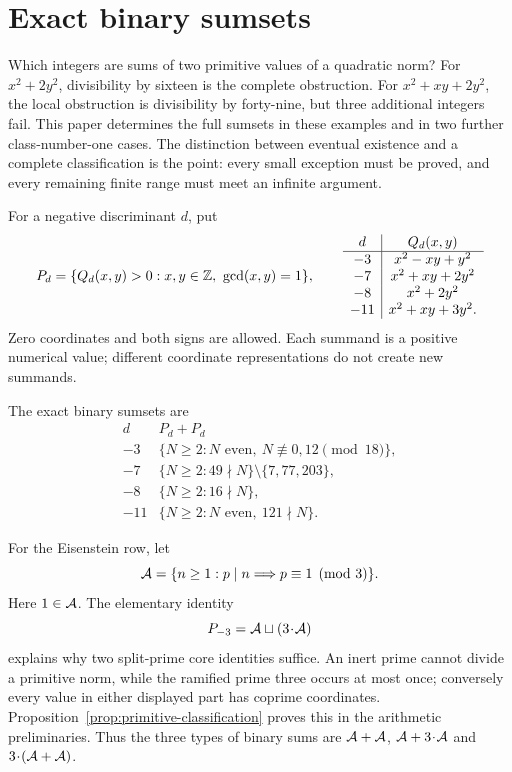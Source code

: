 \section{Exact binary sumsets}

Which integers are sums of two primitive values of a quadratic norm?
For $x^2+2y^2$, divisibility by sixteen is the complete obstruction.
For $x^2+xy+2y^2$, the local obstruction is divisibility by forty-nine,
but three additional integers fail.  This paper determines the full
sumsets in these examples and in two further class-number-one cases.
The distinction between eventual existence and a complete classification
is the point: every small exception must be proved, and every remaining
finite range must meet an infinite argument.

For a negative discriminant $d$, put
\[
 P_d=\{Q_d(x,y)>0:x,y\in\Z,\ \gcd(x,y)=1\},\qquad
 \begin{array}{c|c}
 d&Q_d(x,y)\\\hline
 -3&x^2-xy+y^2\\
 -7&x^2+xy+2y^2\\
 -8&x^2+2y^2\\
 -11&x^2+xy+3y^2.
 \end{array}
\]
Zero coordinates and both signs are allowed.  Each summand is a positive
numerical value; different coordinate representations do not create
new summands.

\begin{theorem}\label{thm:exact-overview}
The exact binary sumsets are
\[
\begin{array}{c|l}
 d&P_d+P_d\\\hline
 -3&\{N\ge2:N\text{ even},\ N\not\equiv0,12\pmod{18}\},\\
 -7&\{N\ge2:49\nmid N\}\setminus\{7,77,203\},\\
 -8&\{N\ge2:16\nmid N\},\\
 -11&\{N\ge2:N\text{ even},\ 121\nmid N\}.
\end{array}
\]
\end{theorem}

For the Eisenstein row, let
\[
 \AA=\{n\ge1:p\mid n\Longrightarrow p\equiv1\pmod3\}.
\]
Here $1\in\AA$.  The elementary identity
\[
                   P_{-3}=\AA\sqcup(3\!\cdot\!\AA)
\]
explains why two split-prime core identities suffice.  An inert prime
cannot divide a primitive norm, while the ramified prime three occurs
at most once; conversely every value in either displayed part has
coprime coordinates.  Proposition~\ref{prop:primitive-classification}
proves this in the arithmetic preliminaries.  Thus the three types of
binary sums are $\AA+\AA$, $\AA+3\!\cdot\!\AA$ and
$3\!\cdot\!(\AA+\AA)$.

